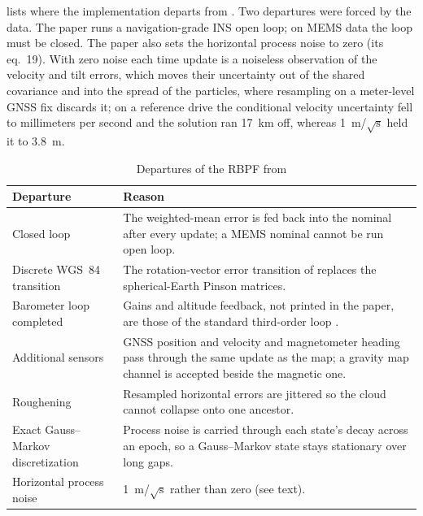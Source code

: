  lists where the implementation departs from \citet{canciani2017airborne}. Two departures were forced by the data. The paper runs a navigation-grade INS open loop; on MEMS data the loop must be closed. The paper also sets the horizontal process noise to zero (its eq.~19). With zero noise each time update is a noiseless observation of the velocity and tilt errors, which moves their uncertainty out of the shared covariance and into the spread of the particles, where resampling on a meter-level GNSS fix discards it; on a reference drive the conditional velocity uncertainty fell to millimeters per second and the solution ran 17~km off, whereas 1~m/\(\sqrt{\text{s}}\) held it to 3.8~m.

\begin{table}[htb]
  \caption{Departures of the RBPF from \citet{canciani2017airborne}}
  \label{tab:rbpf-departures}
  \centering
  \small
  \begin{tabular}{p{}p{}}
    \toprule
    Departure & Reason \\
    \midrule
    Closed loop & The weighted-mean error is fed back into the nominal after every update; a MEMS nominal cannot be run open loop. \\
    Discrete WGS~84 transition & The rotation-vector error transition of \citet{groves_ch14} replaces the spherical-Earth Pinson matrices. \\
    Barometer loop completed & Gains and altitude feedback, not printed in the paper, are those of the standard third-order loop \citep{titterton2004strapdown}. \\
    Additional sensors & GNSS position and velocity and magnetometer heading pass through the same update as the map; a gravity map channel is accepted beside the magnetic one. \\
    Roughening & Resampled horizontal errors are jittered \citep{gordon1993novel} so the cloud cannot collapse onto one ancestor. \\
    Exact Gauss--Markov discretization & Process noise is carried through each state's decay across an epoch, so a Gauss--Markov state stays stationary over long gaps. \\
    Horizontal process noise & 1~m/\(\sqrt{\text{s}}\) rather than zero (see text). \\
    \bottomrule
  \end{tabular}
\end{table}

